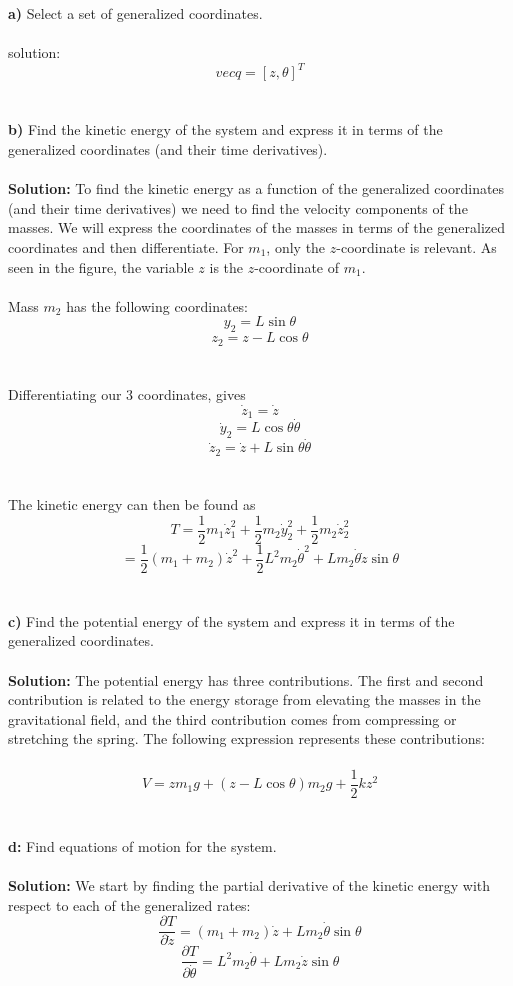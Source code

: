 \textbf{a)} Select a set of generalized coordinates. 
\\
\\
solution: \[vec{q} = [z, \theta]^T\]
\\
\\
\textbf{b)} Find the kinetic energy of the system and express it in terms of the generalized coordinates (and their time derivatives).
\\
\\
\textbf{Solution:} To find the kinetic energy as a function of the generalized coordinates (and their time derivatives) we need to find the velocity components of the masses. We will express the coordinates of the masses in terms of the generalized coordinates and then differentiate. For \(m_1\), only the \(z\)-coordinate is relevant. As seen in the figure, the variable \(z\) is the \(z\)-coordinate of \(m_1\).
\\
\\
Mass \(m_2\) has the following coordinates:
\[
y_2 = L \sin \theta
\]
\[
z_2 = z - L \cos \theta
\]
\\
\\
Differentiating our 3 coordinates, gives
\[
\dot{z}_1 = \dot{z}
\]
\[
\dot{y}_2 = L \cos \theta \dot{\theta}
\]
\[
\dot{z}_2 = \dot{z} + L \sin \theta \dot{\theta}
\]
\\
\\
The kinetic energy can then be found as
\[
T = \frac{1}{2} m_1 \dot{z}_1^2 + \frac{1}{2} m_2 \dot{y}_2^2 + \frac{1}{2} m_2 \dot{z}_2^2
\]
\[
= \frac{1}{2} (m_1 + m_2) \dot{z}^2 + \frac{1}{2} L^2 m_2 \dot{\theta}^2 + L m_2 \dot{\theta} \dot{z} \sin \theta
\]
\\
\\
\textbf{c)} Find the potential energy of the system and express it in terms of the generalized coordinates.
\\
\\
\textbf{Solution:} The potential energy has three contributions. The first and second contribution is related to the energy storage from elevating the masses in the gravitational field, and the third contribution comes from compressing or stretching the spring. The following expression represents these contributions:
\\
\\
\[
V = z m_1 g + (z - L \cos \theta) m_2 g + \frac{1}{2} kz^2
\]
\\
\\
\textbf{d:} Find equations of motion for the system.
\\
\\
\textbf{Solution:} We start by finding the partial derivative of the kinetic energy with respect to each of the generalized rates:
\[
\frac{\partial T}{\partial \dot{z}} = (m_1 + m_2) \dot{z} + L m_2 \dot{\theta} \sin \theta
\]
\[
\frac{\partial T}{\partial \dot{\theta}} = L^2 m_2 \dot{\theta} + L m_2 \dot{z} \sin \theta
\]

